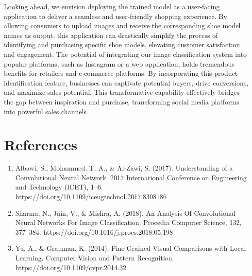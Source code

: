 \documentclass[11pt,a4paper]{article}
\begin{document}
\noindent Looking ahead, we envision deploying the trained model as a user-facing application to deliver a seamless and user-friendly shopping experience. By allowing consumers to upload images and receive the corresponding shoe model names as output, this application can drastically simplify the process of identifying and purchasing specific shoe models, elevating customer satisfaction and engagement. The potential of integrating our image classification system into popular platforms, such as Instagram or a web application, holds tremendous benefits for retailers and e-commerce platforms. By incorporating this product identification feature, businesses can captivate potential buyers, drive conversions, and maximize sales potential. This transformative capability effectively bridges the gap between inspiration and purchase, transforming social media platforms into powerful sales channels.

\pagebreak
\section{References} 
		\begin{enumerate}
		\item Albawi, S., Mohammed, T. A., \& Al-Zawi, S. (2017). Understanding of a Convolutional Neural Network. 2017 International Conference on Engineering and Technology (ICET), 1–6. https://doi.org/10.1109/icengtechnol.2017.8308186
		
		\item Sharma, N., Jain, V., \& Mishra, A. (2018). An Analysis Of Convolutional Neural Networks For Image Classification. Procedia Computer Science, 132, 377–384. https://doi.org/10.1016/j.procs.2018.05.198
		\item Yu, A., \& Grauman, K. (2014). Fine-Grained Visual Comparisons with Local Learning. Computer Vision and Pattern Recognition. https://doi.org/10.1109/cvpr.2014.32 
		\end{enumerate}
\end{document}

